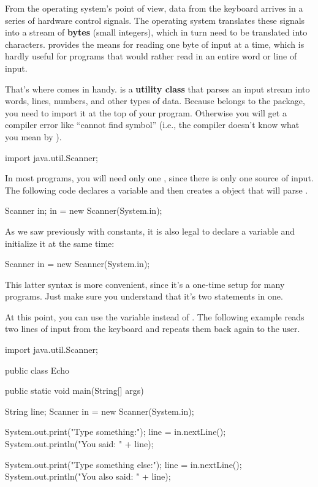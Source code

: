 
From the operating system's point of view, data from the keyboard arrives in a series of hardware control signals.
The operating system translates these signals into a stream of {\bf bytes} (small integers), which in turn need to be translated into characters.
 provides the means for reading one byte of input at a time, which is hardly useful for programs that would rather read in an entire word or line of input.


That's where  comes in handy.
 is a {\bf utility class} that parses an input stream into words, lines, numbers, and other types of data.
Because  belongs to the  package, you need to import it at the top of your program.
Otherwise you will get a compiler error like ``cannot find symbol'' (i.e., the compiler doesn't know what you mean by ).

\begin{code}
import java.util.Scanner;
\end{code}

In most programs, you will need only one , since there is only one source of input.
The following code declares a  variable and then creates a  object that will parse .

\begin{code}
    Scanner in;
    in = new Scanner(System.in);
\end{code}


As we saw previously with constants, it is also legal to declare a variable and initialize it at the same time:

\begin{code}
    Scanner in = new Scanner(System.in);
\end{code}

This latter syntax is more convenient, since it's a one-time setup for many programs.
Just make sure you understand that it's two statements in one.

At this point, you can use the variable  instead of .
The following example reads two lines of input from the keyboard and repeats them back again to the user.

\begin{code}
import java.util.Scanner;

public class Echo {

    public static void main(String[] args) {
        String line;
        Scanner in = new Scanner(System.in);

        System.out.print("Type something:");
        line = in.nextLine();
        System.out.println("You said: " + line);

        System.out.print("Type something else:");
        line = in.nextLine();
        System.out.println("You also said: " + line);
    }

}
\end{code}


